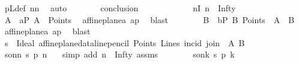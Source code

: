 \begin{isabellebody}
\ pLdef\ nn\ \isamarkupfalse%
\ auto\isanewline
\ \ \ \ \isamarkupfalse%
\ \isamarkupfalse%
\ {\isacharquery}{\kern0pt}conclusion\isanewline
\ \ \ \ \isamarkupfalse%
\isanewline
\ \ \ \ \ \ \isamarkupfalse%
\ nI{\isacharcolon}{\kern0pt}\ {\isachardoublequoteopen}n\ {\isacharequal}{\kern0pt}\ Infty{\isachardoublequoteclose}\isanewline
\ \ \ \ \ \ \isamarkupfalse%
\ {\isachardoublequoteopen}A{\isachardoublequoteclose}\ \ aP{\isacharcolon}{\kern0pt}\ {\isachardoublequoteopen}A\ {\isasymin}\ Points{\isachardoublequoteclose}\ \isamarkupfalse%
\ affine{\isacharunderscore}{\kern0pt}plane{\isachardot}{\kern0pt}a{}\ ap\ \isamarkupfalse%
\ blast\isanewline
\ \ \ \ \ \ \isamarkupfalse%
\ {\isachardoublequoteopen}B{\isachardoublequoteclose}\ \ bP{\isacharcolon}{\kern0pt}\ {\isachardoublequoteopen}B{\isasymin}\ Points\ {\isasymand}\ A\ {\isasymnoteq}\ B{\isachardoublequoteclose}\ \isamarkupfalse%
\ affine{\isacharunderscore}{\kern0pt}plane{\isachardot}{\kern0pt}a{}\ ap\ \isamarkupfalse%
\ blast\isanewline
\ \ \ \ \ \ \isamarkupfalse%
\ {\isacharquery}{\kern0pt}s\ {\isacharequal}{\kern0pt}\ {\isachardoublequoteopen}Ideal\ {\isacharparenleft}{\kern0pt}affine{\isacharunderscore}{\kern0pt}plane{\isacharunderscore}{\kern0pt}data{\isachardot}{\kern0pt}line{\isacharunderscore}{\kern0pt}pencil\ Points\ Lines\ {\isacharparenleft}{\kern0pt}incid{\isacharparenright}{\kern0pt}\ {\isacharparenleft}{\kern0pt}join\ \ A\ B{\isacharparenright}{\kern0pt}{\isacharparenright}{\kern0pt}{\isachardoublequoteclose}\isanewline
\ \ \ \ \ \ \isamarkupfalse%
\ s{\isacharunderscore}{\kern0pt}on{\isacharunderscore}{\kern0pt}n{\isacharcolon}{\kern0pt}\ {\isachardoublequoteopen}{\isacharquery}{\kern0pt}s\ p{\isasymlhd}\ n{\isachardoublequoteclose}\ \ \isamarkupfalse%
\ {\isacharparenleft}{\kern0pt}simp\ add{\isacharcolon}{\kern0pt}\ {\isacartoucheopen}n\ {\isacharequal}{\kern0pt}\ Infty{\isacartoucheclose}\ assms{\isacharparenleft}{\kern0pt}{}{\isacharparenright}{\kern0pt}{\isacharparenright}{\kern0pt}\isanewline
\ \ \ \ \ \ \isamarkupfalse%
\ s{\isacharunderscore}{\kern0pt}on{\isacharunderscore}{\kern0pt}k{\isacharcolon}{\kern0pt}\ {\isachardoublequoteopen}{\isacharquery}{\kern0pt}s\ p{\isasymlhd}\ k{\isachardoublequoteclose}\ \ \isamarkupfalse%

\end{isabellebody}
